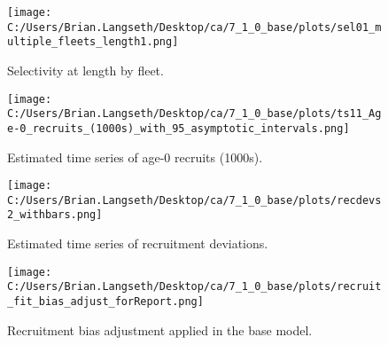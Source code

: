 \documentclass[11pt,
  english,
  a4paper,
]{article}
\begin{document}
\tagmcend\tagstructend


\begin{figure}
\centering
\texttt{[image: C:/Users/Brian.Langseth/Desktop/ca/7\_1\_0\_base/plots/sel01\_multiple\_fleets\_length1.png]}
\caption{Selectivity at length by fleet.\label{fig:selex}}
\end{figure}

\tagmcend\tagstructend


\begin{figure}
\centering
\texttt{[image: C:/Users/Brian.Langseth/Desktop/ca/7\_1\_0\_base/plots/ts11\_Age-0\_recruits\_(1000s)\_with\_95\_asymptotic\_intervals.png]}
\caption{Estimated time series of age-0 recruits (1000s).\label{fig:recruits}}
\end{figure}

\tagmcend\tagstructend


\begin{figure}
\centering
\texttt{[image: C:/Users/Brian.Langseth/Desktop/ca/7\_1\_0\_base/plots/recdevs2\_withbars.png]}
\caption{Estimated time series of recruitment deviations.\label{fig:rec-devs}}
\end{figure}

\tagmcend\tagstructend


\begin{figure}
\centering
\texttt{[image: C:/Users/Brian.Langseth/Desktop/ca/7\_1\_0\_base/plots/recruit\_fit\_bias\_adjust\_forReport.png]}
\caption{Recruitment bias adjustment applied in the base model.\label{fig:bias-adj}}
\end{figure}

\tagmcend\tagstructend

\end{document}
